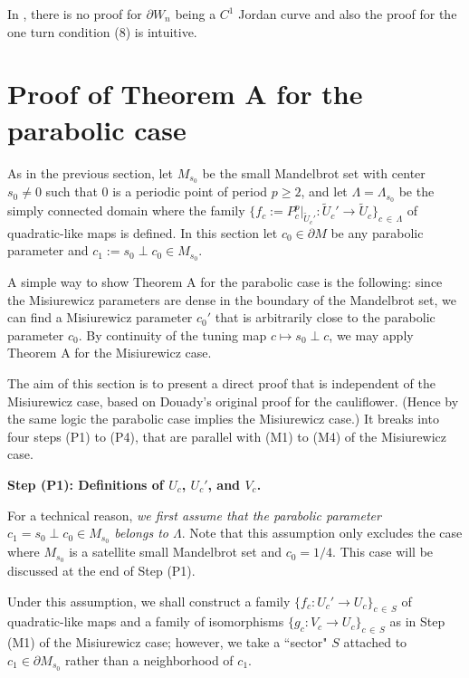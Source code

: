 \begin{rem*}
In \cite{Douady 2000}, there is no proof for $\partial W_n$ being a $C^1$ 
Jordan curve and also the proof for the one turn condition (8) is intuitive. 
\end{rem*}









\section{Proof of Theorem A for the parabolic case}
As in the previous section, 
let $M_{s_0}$ be the small Mandelbrot set with center $s_0 \neq 0$
such that $0$ is a periodic point of period $p \ge 2$,
and let $\Lambda=\Lambda_{s_0}$ be the simply connected domain 
where the family 
$
\{
f_c := P_c^p|_{\widetilde{U}_c'} : \widetilde{U}_c' \to \widetilde{U}_c
\}_{c \, \in \, \Lambda}
$
of quadratic-like maps is defined.
In this section let $c_0 \in \partial M$ be any parabolic parameter 
and $c_1:=s_0 \perp c_0 \in M_{s_0}$.

A simple way to show Theorem A for the parabolic case is the following:
since the Misiurewicz parameters are dense in the boundary of the Mandelbrot set,
we can find a Misiurewicz parameter $c_0'$ that is arbitrarily close to the parabolic parameter $c_0$. By continuity of the tuning map 
$c \mapsto s_0 \perp c$, we may apply Theorem A for the Misiurewicz case.

The aim of this section is to present a direct proof that is 
independent of the Misiurewicz case,
based on Douady's original proof for the cauliflower. 
(Hence by the same logic the parabolic case implies the Misiurewicz case.) 
It breaks into four steps (P1) to (P4),
that are parallel with (M1) to (M4) of the Misiurewicz case.


\medskip


\noin
{\bf Step (P1): Definitions of $U_c$, $U_c'$, and $V_c$.}

\indent
For a technical reason, 
{\it 
we first assume that 
the parabolic parameter $c_1=s_0 \perp c_0 \in M_{s_0}$ 
belongs to $\Lambda$}.
Note that this assumption only excludes the case 
where $M_{s_0}$ is a satellite small Mandelbrot set and $c_0=1/4$. This case will be discussed at the end of Step (P1).

Under this assumption, we shall construct a 
family $\{f_c:U_c' \to U_c\}_{c\, \in \,S}$ 
of quadratic-like maps and a family of isomorphisms 
$\{g_c:V_c \to U_c\}_{c\, \in \,S}$ 
as in Step (M1) of the Misiurewicz case;
however, 
we take a ``sector" $S$ attached to $c_1 \in \partial M_{s_0}$
rather than a neighborhood of $c_1$.


